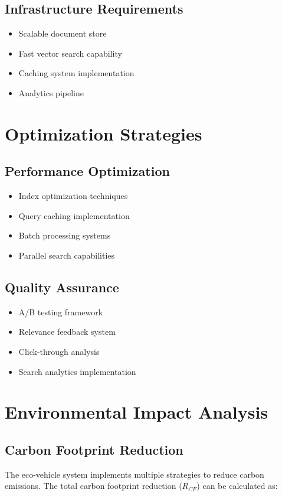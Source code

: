 \documentclass[12pt,a4paper]{article}
\begin{document}
\subsection{Infrastructure Requirements}
\begin{itemize}
    \item Scalable document store
    \item Fast vector search capability
    \item Caching system implementation
    \item Analytics pipeline
\end{itemize}

\section{Optimization Strategies}
\subsection{Performance Optimization}
\begin{itemize}
    \item Index optimization techniques
    \item Query caching implementation
    \item Batch processing systems
    \item Parallel search capabilities
\end{itemize}

\subsection{Quality Assurance}
\begin{itemize}
    \item A/B testing framework
    \item Relevance feedback system
    \item Click-through analysis
    \item Search analytics implementation
\end{itemize}

\section{Environmental Impact Analysis}
\subsection{Carbon Footprint Reduction}
The eco-vehicle system implements multiple strategies to reduce carbon emissions. The total carbon footprint reduction (\(R_{CF}\)) can be calculated as:
\end{document}
